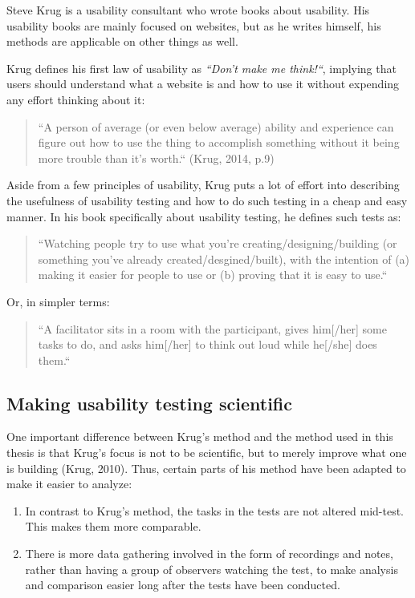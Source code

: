 Steve Krug is a usability consultant who wrote books about usability. His usability books are mainly focused on websites, but as he writes himself, his methods are applicable on other things as well.

Krug defines his first law of usability as \textit{“Don't make me think!“}, implying that users should understand what a website is and how to use it without expending any effort thinking about it:

\begin{quote}
“A person of average (or even below average) ability and experience can figure out how to use the thing to accomplish something without it being more trouble than it's worth.“ (Krug, 2014, p.9)
\end{quote}

Aside from a few principles of usability, Krug puts a lot of effort into describing the usefulness of usability testing and how to do such testing in a cheap and easy manner. In his book specifically about usability testing, he defines such tests as:

\begin{quote}
“Watching people try to use what you're creating/designing/building (or something you've already created/desgined/built), with the intention of (a) making it easier for people to use or (b) proving that it is easy to use.“
\end{quote}

Or, in simpler terms:

\begin{quote}
“A facilitator sits in a room with the participant, gives him[/her] some tasks to do, and asks him[/her] to think out loud while he[/she] does them.“
\end{quote}

\subsection{Making usability testing scientific}

One important difference between Krug's method and the method used in this thesis is that Krug's focus is not to be scientific, but to merely improve what one is building (Krug, 2010). Thus, certain parts of his method have been adapted to make it easier to analyze:

\begin{enumerate}
	\item In contrast to Krug's method, the tasks in the tests are not altered mid-test. This makes them more comparable.
	\item There is more data gathering involved in the form of recordings and notes, rather than having a group of observers watching the test, to make analysis and comparison easier long after the tests have been conducted.
\end{enumerate}

